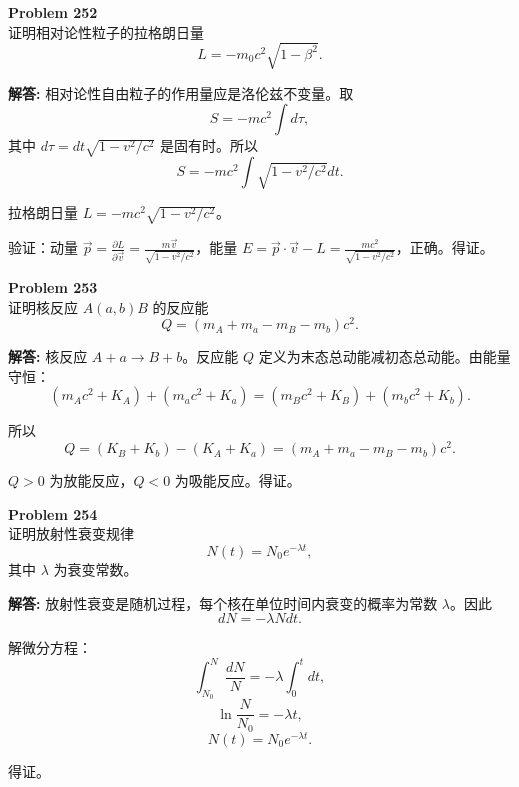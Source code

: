 \documentclass[12pt, a4paper, oneside]{ctexart}
\newenvironment{solution}{\par\noindent\textbf{解答:}\quad}{\par}
\begin{document}
\begin{mdframed}[backgroundcolor=gray!10, linewidth=0pt]
    \textbf{Problem 252} \\
    证明相对论性粒子的拉格朗日量
    \[
    L = -m_0 c^2 \sqrt{1 - \beta^2}.
    \]
\end{mdframed}
\begin{solution}
    相对论性自由粒子的作用量应是洛伦兹不变量。取
    \[
    S = -m c^2 \int d\tau,
    \]
    其中 $d\tau = dt \sqrt{1 - v^2/c^2}$ 是固有时。所以
    \[
    S = -m c^2 \int \sqrt{1 - v^2/c^2} dt.
    \]
    
    拉格朗日量 $L = -m c^2 \sqrt{1 - v^2/c^2}$。
    
    验证：动量 $\vec{p} = \frac{\partial L}{\partial \vec{v}} = \frac{m \vec{v}}{\sqrt{1-v^2/c^2}}$，能量 $E = \vec{p} \cdot \vec{v} - L = \frac{m c^2}{\sqrt{1-v^2/c^2}}$，正确。得证。
\end{solution}

\begin{mdframed}[backgroundcolor=gray!10, linewidth=0pt]
    \textbf{Problem 253} \\
    证明核反应 $A(a, b)B$ 的反应能
    \[
    Q = (m_A + m_a - m_B - m_b) c^2.
    \]
\end{mdframed}
\begin{solution}
    核反应 $A + a \to B + b$。反应能 $Q$ 定义为末态总动能减初态总动能。由能量守恒：
    \[
    (m_A c^2 + K_A) + (m_a c^2 + K_a) = (m_B c^2 + K_B) + (m_b c^2 + K_b).
    \]
    
    所以
    \[
    Q = (K_B + K_b) - (K_A + K_a) = (m_A + m_a - m_B - m_b) c^2.
    \]
    
    $Q>0$ 为放能反应，$Q<0$ 为吸能反应。得证。
\end{solution}

\begin{mdframed}[backgroundcolor=gray!10, linewidth=0pt]
    \textbf{Problem 254} \\
    证明放射性衰变规律
    \[
    N(t) = N_0 e^{-\lambda t},
    \]
    其中 $\lambda$ 为衰变常数。
\end{mdframed}
\begin{solution}
    放射性衰变是随机过程，每个核在单位时间内衰变的概率为常数 $\lambda$。因此
    \[
    dN = -\lambda N dt.
    \]
    
    解微分方程：
    \[
    \int_{N_0}^N \frac{dN}{N} = -\lambda \int_0^t dt,
    \]
    \[
    \ln \frac{N}{N_0} = -\lambda t,
    \]
    \[
    N(t) = N_0 e^{-\lambda t}.
    \]
    
    得证。
\end{solution}
\end{document}
